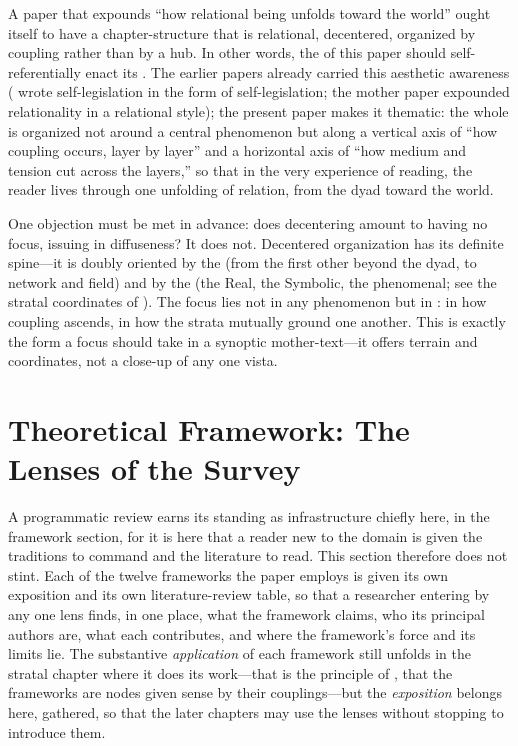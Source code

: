  A paper that expounds ``how relational being unfolds toward the world'' ought itself to have a chapter-structure that is relational, decentered, organized by coupling rather than by a hub. In other words, the  of this paper should self-referentially enact its . The earlier papers already carried this aesthetic awareness ( wrote self-legislation in the form of self-legislation; the mother paper expounded relationality in a relational style); the present paper makes it thematic: the whole is organized not around a central phenomenon but along a vertical axis of ``how coupling occurs, layer by layer'' and a horizontal axis of ``how medium and tension cut across the layers,'' so that in the very experience of reading, the reader lives through one unfolding of relation, from the dyad toward the world.

One objection must be met in advance: does decentering amount to having no focus, issuing in diffuseness? It does not. Decentered organization has its definite spine---it is doubly oriented by the  (from the first other beyond the dyad, to network and field) and by the  (the Real, the Symbolic, the phenomenal; see the stratal coordinates of ). The focus lies not in any phenomenon but in : in how coupling ascends, in how the strata mutually ground one another. This is exactly the form a focus should take in a synoptic mother-text---it offers terrain and coordinates, not a close-up of any one vista.

\section{Theoretical Framework: The Lenses of the Survey}\label{p07:sec:frame}

A programmatic review earns its standing as infrastructure chiefly here, in the framework section, for it is here that a reader new to the domain is given the traditions to command and the literature to read. This section therefore does not stint. Each of the twelve frameworks the paper employs is given its own exposition and its own literature-review table, so that a researcher entering by any one lens finds, in one place, what the framework claims, who its principal authors are, what each contributes, and where the framework's force and its limits lie. The substantive \emph{application} of each framework still unfolds in the stratal chapter where it does its work---that is the principle of , that the frameworks are nodes given sense by their couplings---but the \emph{exposition} belongs here, gathered, so that the later chapters may use the lenses without stopping to introduce them.

